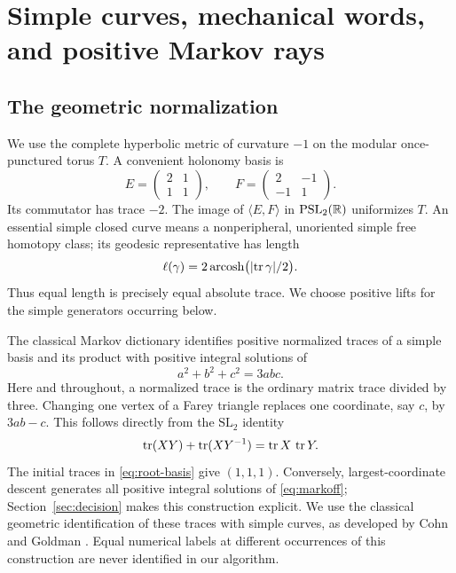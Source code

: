 \section{Simple curves, mechanical words, and positive Markov rays}
\label{sec:rays}

\subsection{The geometric normalization}

We use the complete hyperbolic metric of curvature $-1$ on the modular
once-punctured torus $T$. A convenient holonomy basis is
\begin{equation}\label{eq:root-basis}
 E=\begin{pmatrix}2&1\\1&1\end{pmatrix},\qquad
 F=\begin{pmatrix}2&-1\\-1&1\end{pmatrix}.
\end{equation}
Its commutator has trace $-2$. The image of $\langle E,F\rangle$ in
$\mathrm{PSL}_2(\mathbb{R})$ uniformizes $T$. An essential simple closed curve
means a nonperipheral, unoriented simple free homotopy class; its geodesic
representative has length
\begin{equation}\label{eq:length-trace}
 \ell(\gamma)=2\operatorname{arcosh}\bigl(\lvert\operatorname{tr}\gamma\rvert/2\bigr).
\end{equation}
Thus equal length is precisely equal absolute trace. We choose positive
lifts for the simple generators occurring below.

The classical Markov dictionary identifies positive normalized traces
of a simple basis and its product with positive integral solutions of
\begin{equation}\label{eq:markoff}
 a^2+b^2+c^2=3abc.
\end{equation}
Here and throughout, a normalized trace is the ordinary matrix trace
divided by three. Changing one vertex of a Farey triangle replaces one
coordinate, say $c$, by $3ab-c$. This follows directly from the
$\mathrm{SL}_2$ identity
$$
 \operatorname{tr}(XY)+\operatorname{tr}(XY^{-1})=\operatorname{tr} X\,\operatorname{tr} Y.
$$
The initial traces in \eqref{eq:root-basis} give $(1,1,1)$.
Conversely, largest-coordinate descent generates all positive integral
solutions of \eqref{eq:markoff}; Section~\ref{sec:decision} makes this
construction explicit. We use the classical geometric identification of
these traces with simple curves, as developed by Cohn and Goldman
\cite{Cohn1971,Goldman2003}. Equal numerical labels at different
occurrences of this construction are never identified in our algorithm.

